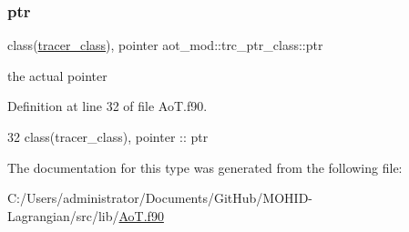 \subsubsection{\texorpdfstring{ptr}{ptr}}
{\footnotesize\ttfamily class(\mbox{\hyperlink{structtracer__base__mod_1_1tracer__class}{tracer\+\_\+class}}), pointer aot\+\_\+mod\+::trc\+\_\+ptr\+\_\+class\+::ptr\hspace{0.3cm}{\ttfamily [private]}}



the actual pointer 



Definition at line 32 of file Ao\+T.\+f90.


\begin{DoxyCode}
32         \textcolor{keywordtype}{class}(tracer\_class), \textcolor{keywordtype}{pointer} :: ptr
\end{DoxyCode}


The documentation for this type was generated from the following file\+:\begin{DoxyCompactItemize}
\item 
C\+:/\+Users/administrator/\+Documents/\+Git\+Hub/\+M\+O\+H\+I\+D-\/\+Lagrangian/src/lib/\mbox{\hyperlink{_ao_t_8f90}{Ao\+T.\+f90}}\end{DoxyCompactItemize}
